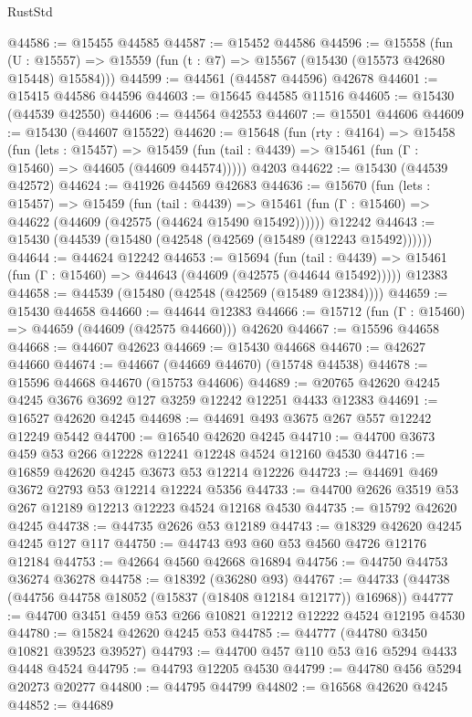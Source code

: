 \begin{lexlean}{RustStd}
\begin{coremodule}
@44586 := @15455 @44585
@44587 := @15452 @44586
@44596 := @15558
    (fun (U : @15557) => @15559 (fun (t : @7) => @15567 (@15430 (@15573 @42680 @15448) @15584)))
@44599 := @44561 (@44587 @44596) @42678
@44601 := @15415 @44586 @44596
@44603 := @15645 @44585 @11516
@44605 := @15430 (@44539 @42550)
@44606 := @44564 @42553
@44607 := @15501 @44606
@44609 := @15430 (@44607 @15522)
@44620 := @15648
    (fun (rty : @4164) =>
    @15458
      (fun (lets : @15457) =>
      @15459 (fun (tail : @4439) => @15461 (fun (Γ : @15460) => @44605 (@44609 @44574)))))
    @4203
@44622 := @15430 (@44539 @42572)
@44624 := @41926 @44569 @42683
@44636 := @15670
    (fun (lets : @15457) =>
    @15459
      (fun (tail : @4439) =>
      @15461 (fun (Γ : @15460) => @44622 (@44609 (@42575 (@44624 @15490 @15492))))))
    @12242
@44643 := @15430 (@44539 (@15480 (@42548 (@42569 (@15489 (@12243 @15492))))))
@44644 := @44624 @12242
@44653 := @15694
    (fun (tail : @4439) => @15461 (fun (Γ : @15460) => @44643 (@44609 (@42575 (@44644 @15492)))))
    @12383
@44658 := @44539 (@15480 (@42548 (@42569 (@15489 @12384))))
@44659 := @15430 @44658
@44660 := @44644 @12383
@44666 := @15712 (fun (Γ : @15460) => @44659 (@44609 (@42575 @44660))) @42620
@44667 := @15596 @44658
@44668 := @44607 @42623
@44669 := @15430 @44668
@44670 := @42627 @44660
@44674 := @44667 (@44669 @44670) (@15748 @44538)
@44678 := @15596 @44668 @44670 (@15753 @44606)
@44689 := @20765 @42620 @4245 @4245 @3676 @3692 @127 @3259 @12242 @12251 @4433 @12383
@44691 := @16527 @42620 @4245
@44698 := @44691 @493 @3675 @267 @557 @12242 @12249 @5442
@44700 := @16540 @42620 @4245
@44710 := @44700 @3673 @459 @53 @266 @12228 @12241 @12248 @4524 @12160 @4530
@44716 := @16859 @42620 @4245 @3673 @53 @12214 @12226
@44723 := @44691 @469 @3672 @2793 @53 @12214 @12224 @5356
@44733 := @44700 @2626 @3519 @53 @267 @12189 @12213 @12223 @4524 @12168 @4530
@44735 := @15792 @42620 @4245
@44738 := @44735 @2626 @53 @12189
@44743 := @18329 @42620 @4245 @4245 @127 @117
@44750 := @44743 @93 @60 @53 @4560 @4726 @12176 @12184
@44753 := @42664 @4560 @42668 @16894
@44756 := @44750 @44753 @36274 @36278
@44758 := @18392 (@36280 @93)
@44767 := @44733 (@44738 (@44756 @44758 @18052 (@15837 (@18408 @12184 @12177)) @16968))
@44777 := @44700 @3451 @459 @53 @266 @10821 @12212 @12222 @4524 @12195 @4530
@44780 := @15824 @42620 @4245 @53
@44785 := @44777 (@44780 @3450 @10821 @39523 @39527)
@44793 := @44700 @457 @110 @53 @16 @5294 @4433 @4448 @4524
@44795 := @44793 @12205 @4530
@44799 := @44780 @456 @5294 @20273 @20277
@44800 := @44795 @44799
@44802 := @16568 @42620 @4245
@44852 := @44689

\end{coremodule}
\end{lexlean}
